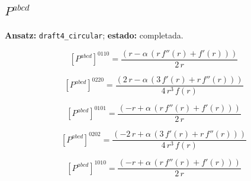 \documentclass[11pt]{article}
\begin{document}
\subsection*{$ P^{abcd} $}
\textbf{Ansatz:} \texttt{draft4\_circular}; \textbf{estado:} completada.\par
\begin{dmath*}[breakdepth={5}]
\left[P^{abcd}\right]^{0110} = \frac{\left(r - \alpha\,\left(r\,f''\!\left(r\right) + f'\!\left(r\right)\right)\right)}{2\,r}
\end{dmath*}
\par\smallskip
\begin{dmath*}[breakdepth={5}]
\left[P^{abcd}\right]^{0220} = \frac{\left(2\,r - \alpha\,\left(3\,f'\!\left(r\right) + r\,f''\!\left(r\right)\right)\right)}{4\,{r}^{3}\,f\!\left(r\right)}
\end{dmath*}
\par\smallskip
\begin{dmath*}[breakdepth={5}]
\left[P^{abcd}\right]^{0101} = \frac{\left(-r + \alpha\,\left(r\,f''\!\left(r\right) + f'\!\left(r\right)\right)\right)}{2\,r}
\end{dmath*}
\par\smallskip
\begin{dmath*}[breakdepth={5}]
\left[P^{abcd}\right]^{0202} = \frac{\left(-2\,r + \alpha\,\left(3\,f'\!\left(r\right) + r\,f''\!\left(r\right)\right)\right)}{4\,{r}^{3}\,f\!\left(r\right)}
\end{dmath*}
\par\smallskip
\begin{dmath*}[breakdepth={5}]
\left[P^{abcd}\right]^{1010} = \frac{\left(-r + \alpha\,\left(r\,f''\!\left(r\right) + f'\!\left(r\right)\right)\right)}{2\,r}
\end{dmath*}
\par\smallskip
\end{document}
